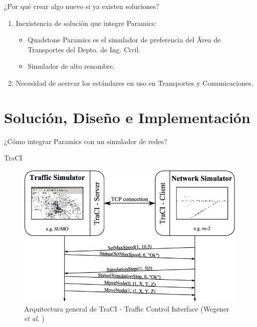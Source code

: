 \documentclass[aspectratio=169]{beamer}
\begin{document}
\begin{frame}{¿Por qué crear algo nuevo si ya existen soluciones?}
\begin{enumerate}
    \item Inexistencia de solución que integre Paramics:\pause
    \begin{itemize}
        \item Quadstone Paramics es el simulador de preferencia del Área de Transportes del Depto. de Ing. Civil.
        \item Simulador de alto renombre.\pause
    \end{itemize}
    \item Necesidad de acercar los estándares en uso en Transportes y Comunicaciones.

\end{enumerate}
\end{frame}


\section{Solución, Diseño e Implementación}
\begin{frame}[standout]
\centering
¿Cómo integrar Paramics con un simulador de redes?
\end{frame}

\begin{frame}{TraCI}
\begin{figure}
    \centering
    \includegraphics[width=.7\linewidth]{figuras/traci-arch.png}
    \caption{Arquitectura general de TraCI - Traffic Control Interface (Wegener \emph{et al.} \autocite{traci})}
    \label{fig:traci}
\end{figure}
\end{frame}
\end{document}
